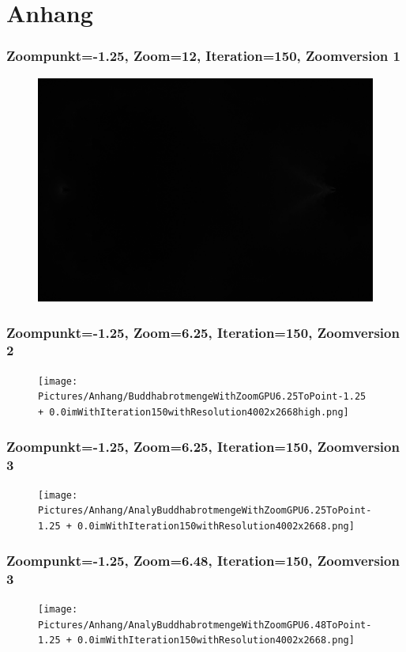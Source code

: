 \section{Anhang}

\subsubsection*{Zoompunkt=-1.25, Zoom=12, Iteration=150, Zoomversion 1}
\begin{figure}[h]
    \centering
    \includegraphics[width=.5\textwidth]{Pictures/Anhang/BuddhabrotmengeWithZoom12ToPoint-1.25 + 0.0imWithIteration150withResolution4000x2667.png}
    \label{fig:Version1}
\end{figure}
\bigskip
\subsubsection*{Zoompunkt=-1.25, Zoom=6.25, Iteration=150, Zoomversion 2}
\begin{figure}[h]
    \centering
    \texttt{[image: Pictures/Anhang/BuddhabrotmengeWithZoomGPU6.25ToPoint-1.25 + 0.0imWithIteration150withResolution4002x2668high.png]}
    \label{fig:Version2}
\end{figure}
\bigskip
\subsubsection*{Zoompunkt=-1.25, Zoom=6.25, Iteration=150, Zoomversion 3}
\begin{figure}[h]
    \centering
    \texttt{[image: Pictures/Anhang/AnalyBuddhabrotmengeWithZoomGPU6.25ToPoint-1.25 + 0.0imWithIteration150withResolution4002x2668.png]}
    \label{fig:Version3}
\end{figure}
\bigskip
\subsubsection*{Zoompunkt=-1.25, Zoom=6.48, Iteration=150, Zoomversion 3}
\begin{figure}[h]
    \centering
    \texttt{[image: Pictures/Anhang/AnalyBuddhabrotmengeWithZoomGPU6.48ToPoint-1.25 + 0.0imWithIteration150withResolution4002x2668.png]}
    \label{fig:Version3}
\end{figure}
\bigskip

